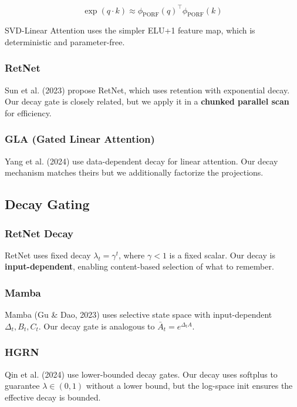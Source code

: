 \[
\exp(q \cdot k) \approx \phi_{\text{PORF}}(q)^\top \phi_{\text{PORF}}(k)
\tag{2.2}
\]

SVD-Linear Attention uses the simpler ELU+1 feature map, which is 
deterministic and parameter-free.

\subsubsection{RetNet}

Sun et al. (2023) propose RetNet, which uses retention with exponential 
decay. Our decay gate is closely related, but we apply it in a 
\textbf{chunked parallel scan} for efficiency.

\subsubsection{GLA (Gated Linear Attention)}

Yang et al. (2024) use data-dependent decay for linear attention. Our 
decay mechanism matches theirs but we additionally factorize the projections.

\subsection{Decay Gating}

\subsubsection{RetNet Decay}

RetNet uses fixed decay $\lambda_t = \gamma^{t}$, where $\gamma < 1$ is a 
fixed scalar. Our decay is \textbf{input-dependent}, enabling content-based 
selection of what to remember.

\subsubsection{Mamba}

Mamba (Gu \& Dao, 2023) uses selective state space with input-dependent 
$\Delta_t, B_t, C_t$. Our decay gate is analogous to $\bar{A}_t = e^{\Delta_t A}$.

\subsubsection{HGRN}

Qin et al. (2024) use lower-bounded decay gates. Our decay uses softplus 
to guarantee $\lambda \in (0, 1)$ without a lower bound, but the log-space 
init ensures the effective decay is bounded.

